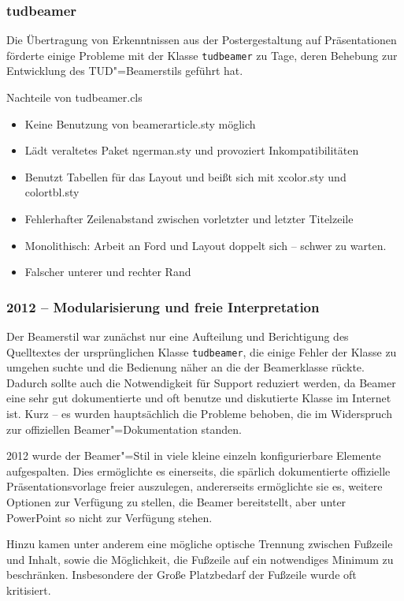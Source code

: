 \begin{frame}[allowframebreaks]
  \frametitle{tudbeamer} Die Übertragung von Erkenntnissen aus der
  Postergestaltung auf Präsentationen förderte einige Probleme mit der
  Klasse \texttt{tudbeamer} zu Tage, deren Behebung zur Entwicklung
  des TUD"=Beamerstils geführt hat.

  \begin{block}{Nachteile von tudbeamer.cls}
    \begin{itemize}
    \item Keine Benutzung von beamerarticle.sty möglich
    \item Lädt veraltetes Paket ngerman.sty und provoziert Inkompatibilitäten
    \item Benutzt Tabellen für das Layout und beißt sich mit xcolor.sty und colortbl.sty
    \item Fehlerhafter Zeilenabstand zwischen vorletzter und letzter Titelzeile
    \item Monolithisch: Arbeit an Ford und Layout doppelt sich – schwer zu warten.
    \item Falscher unterer und rechter Rand
    \end{itemize}
  \end{block}
\end{frame}
\begin{frame}[allowframebreaks]
  \frametitle{2012 – Modularisierung und freie Interpretation}

  Der Beamerstil war zunächst nur eine Aufteilung und Berichtigung des
  Quelltextes der ursprünglichen Klasse \texttt{tudbeamer}, die einige
  Fehler der Klasse zu umgehen suchte und die Bedienung näher an die
  der Beamerklasse rückte. Dadurch sollte auch die Notwendigkeit für
  Support reduziert werden, da Beamer eine sehr gut dokumentierte und
  oft benutze und diskutierte Klasse im Internet ist. Kurz – es wurden
  hauptsächlich die Probleme behoben, die im Widerspruch zur
  offiziellen Beamer"=Dokumentation standen.

  2012 wurde der Beamer"=Stil in viele kleine einzeln konfigurierbare
  Elemente aufgespalten. Dies ermöglichte es einerseits, die spärlich
  dokumentierte offizielle Präsentationsvorlage freier auszulegen,
  andererseits ermöglichte sie es, weitere Optionen zur Verfügung zu
  stellen, die Beamer bereitstellt, aber unter PowerPoint so nicht zur
  Verfügung stehen.

  Hinzu kamen unter anderem eine mögliche optische Trennung zwischen
  Fußzeile und Inhalt, sowie die Möglichkeit, die Fußzeile auf ein
  notwendiges Minimum zu beschränken. Insbesondere der Große
  Platzbedarf der Fußzeile wurde oft kritisiert.
\end{frame}
